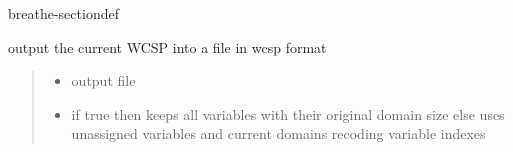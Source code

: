 \documentclass[letterpaper,10pt,openany,oneside,english]{sphinxmanual}
\begin{document}
\begin{fulllineitems}
\begin{sphinxuseclass}{breathe-sectiondef}
\begin{fulllineitems}
\label{\detokenize{ref/ref_cpp:_CPPv4N11WeightedCSP8dump_CFNER7ostreamb}}\label{\detokenize{ref/ref_cpp:_CPPv3N11WeightedCSP8dump_CFNER7ostreamb}}\label{\detokenize{ref/ref_cpp:_CPPv2N11WeightedCSP8dump_CFNER7ostreamb}}\label{\detokenize{ref/ref_cpp:WeightedCSP::dump_CFN__ostreamR.b}}
\pysigstartsignatures
\pysigstartmultiline
{}
\pysigstopmultiline
\pysigstopsignatures
\sphinxAtStartPar
output the current WCSP into a file in wcsp format 
\begin{quote}\begin{description}
\begin{itemize}
\item {} 
\sphinxAtStartPar
{} \textendash{} output file

\item {} 
\sphinxAtStartPar
{} \textendash{} if true then keeps all variables with their original domain size else uses unassigned variables and current domains recoding variable indexes 

\end{itemize}

\end{description}\end{quote}

\end{fulllineitems}



\end{sphinxuseclass}
\end{fulllineitems}
\end{document}
